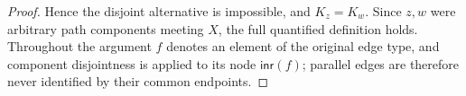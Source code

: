 \begin{proof}
Hence the disjoint alternative is impossible, and $K_z=K_w$.  Since
$z,w$ were arbitrary path components meeting $X$, the full quantified
definition  holds.  Throughout the argument
$f$ denotes an element of the original edge type, and component
disjointness is applied to its node $\mathsf{inr}(f)$; parallel edges are
therefore never identified by their common endpoints.
\end{proof}
